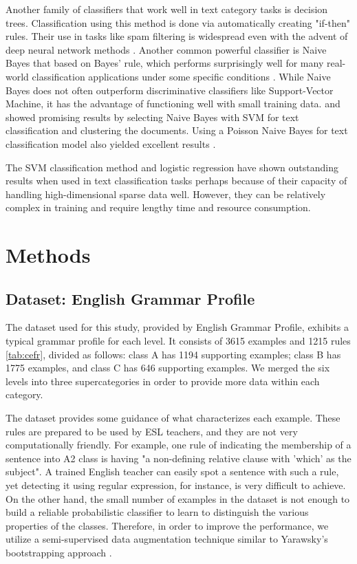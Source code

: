 Another family of classifiers that work well in text category tasks is decision trees. Classification using this method is done via automatically creating  "if-then" rules. Their use in tasks like spam filtering is widespread even with the advent of deep neural network methods \citep{wu_behavior-based_2009}. Another common powerful classifier is Naive Bayes that based on Bayes' rule, which performs surprisingly well for many real-world classification applications under some specific conditions \citep{mccallum1998comparison, rish_analysis_2001}. While Naive Bayes does not often outperform discriminative classifiers like Support-Vector Machine, it has the advantage of functioning well with small training data. \citep{kim_effective_2006} and \citep{isa_text_2008} showed promising results by selecting Naive Bayes with SVM for text classification and clustering the documents. Using a Poisson Naive Bayes for text classification model also yielded excellent results \citep{isa_text_2008}.  
 
The SVM classification method and logistic regression have shown outstanding results when used in text classification tasks \citep{Yang1999ARO} \citep{brucher2002document} perhaps because of their capacity of handling high-dimensional sparse data well.  However, they can be relatively complex in training and require lengthy time and resource consumption.



\section{Methods}
\label{sec:logistic}

\subsection{Dataset: English Grammar Profile}
The dataset used for this study, provided by English Grammar Profile, exhibits a typical grammar profile for each level. It consists of 3615 examples and 1215 rules \ref{tab:cefr}, divided as follows: class A has 1194 supporting examples; class B has 1775 examples, and class C has 646 supporting examples. We merged the six levels into three supercategories in order to provide more data within each category. 

The dataset provides some guidance of what characterizes each example. These rules are prepared to be used by ESL teachers, and they are not very computationally friendly. For example, one rule of indicating the membership of a sentence into A2 class is having "a non-defining relative clause with 'which' as the subject". A trained English teacher can easily spot a sentence with such a rule, yet detecting it using regular expression, for instance, is very difficult to achieve. On the other hand, the small number of examples in the dataset is not enough to build a reliable probabilistic classifier to learn to distinguish the various properties of the classes. Therefore, in order to improve the performance, we utilize a semi-supervised data augmentation technique similar to Yarawsky's bootstrapping approach \citep{yarowsky_unsupervised_1995}. 

